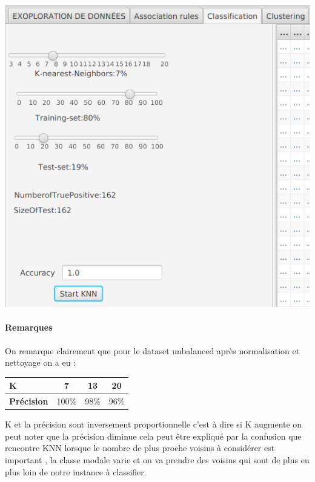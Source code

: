 \documentclass[12pt,a4paper,oneside]{book}
\begin{document}
\begin{frame}{}
\begin{minipage}[b]{0.5\linewidth}
				\label{labelname}%
			\end{minipage}
		\end{frame}
		
	\begin{minipage}[b]{0.5\linewidth}
		\centering
		\includegraphics[scale=0.5]{image/k=7unbalanced.png}%
		\label{labelname}%
	\end{minipage}
	\paragraph{Remarques}
	On remarque clairement que pour le dataset unbalanced après normalisation et nettoyage on a eu :
	\begin{center}
		\begin{tabular}{ | l || c | c | c | }
			\hline
		\textbf{K} & 7 & 13 & 20\\
		 \hline
			\textbf{ Précision} & 100\%  & 98\%  & 96\% \\
			\hline
		\end{tabular}
	\end{center}
	
	K et la précision sont inversement proportionnelle c'est à dire si K augmente on peut noter que la précision diminue cela peut être expliqué par la confusion  que rencontre KNN lorsque le nombre de plus proche voisins à considérer est important , la classe modale varie et on va prendre des voisins qui sont de plus en plus loin de notre instance à classifier.
	
\end{document}
